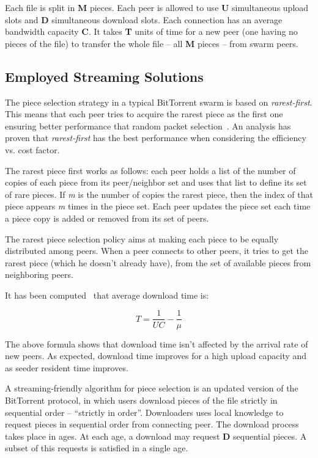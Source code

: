 Each file is split in \textbf{M} pieces. Each peer is allowed to use
\textbf{U} simultaneous upload slots and \textbf{D} simultaneous download
slots. Each connection has an average bandwidth capacity \textbf{C}. It takes
\textbf{T} units of time for a new peer (one having no pieces of the file) to
transfer the whole file -- all \textbf{M} pieces -- from swarm peers.

\subsection{Employed Streaming Solutions}
\label{subsec:multimedia-dist:libtorrent-streaming}

The piece selection strategy in a typical BitTorrent swarm is based on
\textit{rarest-first}. This means that each peer tries to acquire the rarest
piece as the first one ensuring better performance that random packet
selection~\cite{bt-analysis}\cite{scaling-networks}. An analysis has proven that
\textit{rarest-first} has the best performance when considering the efficiency
vs. cost factor.

The rarest piece first works as follows: each peer holds a list of the number
of copies of each piece from its peer/neighbor set and uses that list to
define its set of rare pieces. If \textit{m} is the number of copies the
rarest piece, then the index of that piece appears \textit{m} times in the
piece set. Each peer updates the piece set each time a piece copy is added or
removed from its set of peers.

The rarest piece selection policy aims at making each piece to be equally
distributed among peers. When a peer connects to other peers, it tries to
get the rarest piece (which he doesn't already have), from the set of
available pieces from neighboring peers.

It has been computed~\cite{bt-analysis-on-demand} that average download time is:

\begin{equation}
T = \frac{1}{UC}-\frac{1}{\mu}
\end{equation}

The above formula shows that download time isn't affected by the arrival rate
of new peers. As expected, download time improves for a high upload capacity
and as seeder resident time improves.

A streaming-friendly algorithm for piece selection is an updated version of
the BitTorrent protocol, in which users download pieces of the file strictly
in sequential order -- ``strictly in order''. Downloaders uses local knowledge
to request pieces in sequential order from connecting peer. The download
process takes place in ages. At each age, a download may request \textbf{D}
sequential pieces. A subset of this requests is satisfied in a single age.

